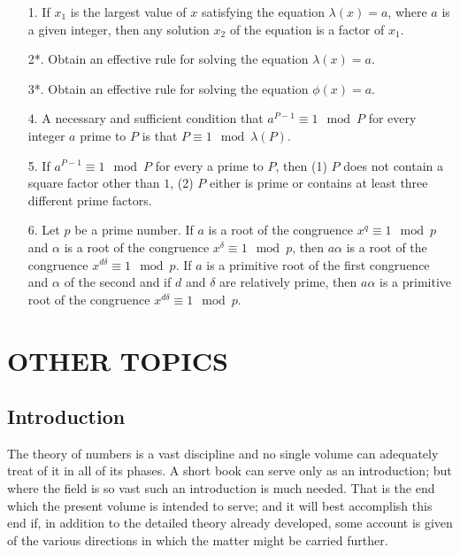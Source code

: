 \documentclass[oneside]{book}
\begin{document}
\small\begin{enumerate}
\item[1.] If $x_1$ is the largest value of $x$ satisfying the equation
$\lambda(x) = a$, where $a$ is a given integer, then any solution
$x_2$ of the equation is a factor of $x_1$.

\item[2*.] Obtain an effective rule for solving the equation
$\lambda(x) = a$.

\item[3*.] Obtain an effective rule for solving the equation
$\phi(x) = a$.

\item[4.] A necessary and sufficient condition that $a^{P-1} \equiv 1
\mod P$ for every integer $a$ prime to $P$ is that $P \equiv 1 \mod
\lambda(P)$.

\item[5.] If $a^{P-1} \equiv 1\mod P$ for every a prime to $P$, then
(1) $P$ does not contain a square factor other than $1$, (2) $P$
either is prime or contains at least three different prime factors.

\item[6.] Let $p$ be a prime number. If $a$ is a root of the congruence
$x^q \equiv 1 \mod p$ and $\alpha$ is a root of the congruence
$x^\delta\equiv 1 \mod p$, then $a\alpha$ is a root of the
congruence $x^{d\delta}\equiv 1 \mod p$. If $a$ is a primitive root
of the first congruence and $\alpha$ of the second and if $d$ and
$\delta$ are relatively prime, then $a\alpha$ is a primitive root of
the congruence $x^{d\delta} \equiv 1\mod p$.
\end{enumerate} \normalsize{}

\chapter{OTHER TOPICS}

\section{Introduction}\label{s40}

The theory of numbers is a vast discipline and no single volume can
adequately treat of it in all of its phases. A short book can serve
only as an introduction; but where the field is so vast such an
introduction is much needed. That is the end which the present
volume is intended to serve; and it will best accomplish this end
if, in addition to the detailed theory already developed, some
account is given of the various directions in which the matter might
be carried further.
\end{document}
